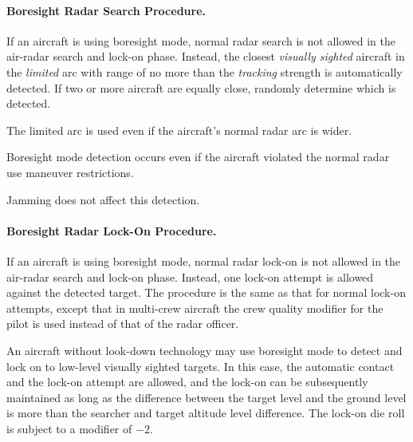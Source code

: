 \begin{advancedrules}
{\paragraph{Boresight Radar Search Procedure.} If an aircraft is using boresight mode, normal radar search is not allowed in the air-radar search and lock-on phase. Instead, the closest \emph{visually sighted} aircraft in the \emph{limited} arc with range of no more than the \emph{tracking} strength is automatically detected. If two or more aircraft are equally close, randomly determine which is detected. 

The limited arc is used even if the aircraft's normal radar arc is wider.

Boresight mode detection occurs even if the aircraft violated the normal radar use maneuver restrictions.

Jamming does not affect this detection. 

\paragraph{Boresight Radar Lock-On Procedure.}

If an aircraft is using boresight mode, normal radar lock-on is not allowed in the air-radar search and lock-on phase.
Instead, one lock-on attempt is allowed against the detected target. The procedure is the same as that for normal lock-on attempts, except that in  multi-crew aircraft the crew quality modifier for the pilot is used instead of that of the radar officer.


An aircraft without look-down technology may use boresight mode to detect and lock on to low-level visually sighted targets. In this case, the automatic contact and the lock-on attempt are allowed, and the lock-on can be subsequently maintained as long as the difference between the target level and the ground level is more than the searcher and target altitude level difference. The lock-on die roll is subject to a modifier of $-2$. }

\end{advancedrules}
